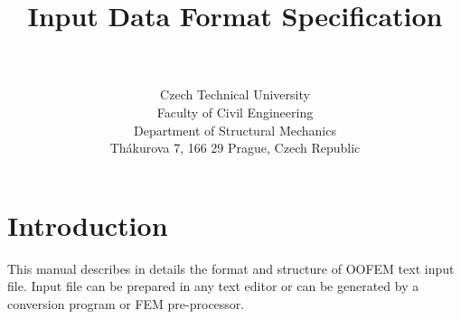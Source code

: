 \documentclass[a4paper]{article}
\begin{document}
\title{
Input Data Format Specification}
\author{\bp \\ \\
Czech Technical University\\
Faculty of Civil Engineering\\
Department of Structural Mechanics\\
Th\'akurova 7, 166 29 Prague, Czech Republic
}
\maketitle

\newpage
\tableofcontents
\newpage
\section{Introduction}
This manual describes in details the format and structure of OOFEM
text input file. Input file can be prepared in any text editor or can be generated
by a conversion program or FEM pre-processor.
\end{document}

